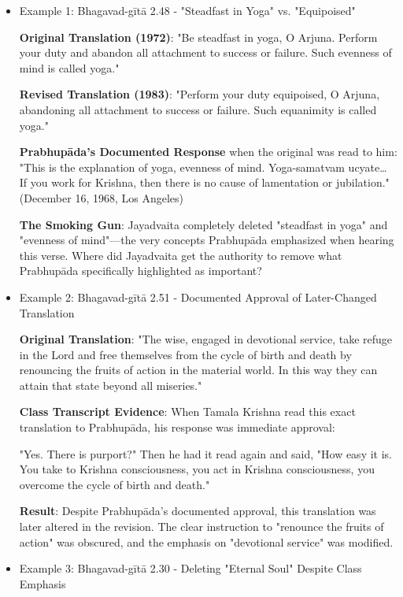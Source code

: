 \documentclass[11pt,twoside]{book}
\begin{document}
\begin{itemize}
\item Example 1: Bhagavad-gītā 2.48 - "Steadfast in Yoga" vs. "Equipoised"
\label{sec:org669ff25}

\textbf{\textbf{Original Translation (1972)}}: "Be steadfast in yoga, O Arjuna. Perform your duty and abandon all attachment to success or failure. Such evenness of mind is called yoga."

\textbf{\textbf{Revised Translation (1983)}}: "Perform your duty equipoised, O Arjuna, abandoning all attachment to success or failure. Such equanimity is called yoga."

\textbf{\textbf{Prabhupāda's Documented Response}} when the original was read to him:
"This is the explanation of yoga, evenness of mind. Yoga-samatvam ucyate\ldots{} If you work for Krishna, then there is no cause of lamentation or jubilation." (December 16, 1968, Los Angeles)

\textbf{\textbf{The Smoking Gun}}: Jayadvaita completely deleted "steadfast in yoga" and "evenness of mind"—the very concepts Prabhupāda emphasized when hearing this verse. Where did Jayadvaita get the authority to remove what Prabhupāda specifically highlighted as important?
\item Example 2: Bhagavad-gītā 2.51 - Documented Approval of Later-Changed Translation
\label{sec:org525aee1}

\textbf{\textbf{Original Translation}}: "The wise, engaged in devotional service, take refuge in the Lord and free themselves from the cycle of birth and death by renouncing the fruits of action in the material world. In this way they can attain that state beyond all miseries."

\textbf{\textbf{Class Transcript Evidence}}: When Tamala Krishna read this exact translation to Prabhupāda, his response was immediate approval:

"Yes. There is purport?" Then he had it read again and said, "How easy it is. You take to Krishna consciousness, you act in Krishna consciousness, you overcome the cycle of birth and death." 

\textbf{\textbf{Result}}: Despite Prabhupāda's documented approval, this translation was later altered in the revision. The clear instruction to "renounce the fruits of action" was obscured, and the emphasis on "devotional service" was modified.
\item Example 3: Bhagavad-gītā 2.30 - Deleting "Eternal Soul" Despite Class Emphasis
\label{sec:org7b4b189}


\end{itemize}
\end{document}
